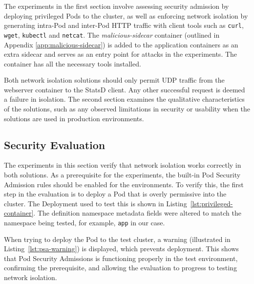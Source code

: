 \documentclass[english, 12pt, a4paper, sci, utf8, a-2b, online]{aaltothesis}
\begin{document}
The experiments in the first section involve assessing security admission by deploying privileged Pods to the cluster, as well as enforcing network isolation by generating intra-Pod and inter-Pod HTTP traffic with client tools such as \lstinline{curl}, \lstinline{wget}, \lstinline{kubectl} and \lstinline{netcat}.
The \emph{malicious-sidecar} container (outlined in Appendix \ref{app:malicious-sidecar}) is added to the application containers as an extra sidecar and serves as an entry point for attacks in the experiments.
The container has all the necessary tools installed.



Both network isolation solutions should only permit UDP traffic from the webserver container to the StatsD client.
Any other successful request is deemed a failure in isolation.
The second section examines the qualitative characteristics of the solutions, such as any observed limitations in security or usability when the solutions are used in production environments.

\subsection{Security Evaluation}

The experiments in this section verify that network isolation works correctly in both solutions.
As a prerequisite for the experiments, the built-in Pod Security Admission rules should be enabled for the environments.
To verify this, the first step in the evaluation is to deploy a Pod that is overly permissive into the cluster.
The Deployment used to test this is shown in Listing~\ref{lst:privileged-container}.
The definition namespace metadata fields were altered to match the namespace being tested, for example, \lstinline{app} in our case.

When trying to deploy the Pod to the test cluster, a warning (illustrated in Listing~\ref{lst:psa-warning}) is displayed, which prevents deployment.
This shows that Pod Security Admissions is functioning properly in the test environment, confirming the prerequisite, and allowing the evaluation to progress to testing network isolation.


\end{document}
